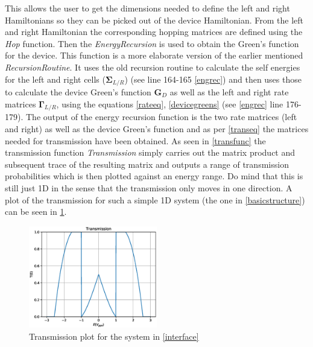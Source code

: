 This allows the user to get the dimensions needed to define the left and right Hamiltonians so they can be picked out of the device Hamiltonian. From the left and right Hamiltonian the corresponding hopping matrices are defined using the \textit{Hop} function. Then the \textit{EnergyRecursion} is used to obtain the Green's function for the device. This function is a more elaborate version of the earlier mentioned \textit{RecursionRoutine}. It uses the old recursion routine to calculate the self energies for the left and right cells (\(\mathbf{\Sigma}_{L/R}\)) (see line 164-165 \cref{engrec}) and then uses those to calculate the device Green's function \(\textbf{G}_D\) as well as the left and right rate matrices \(\mathbf{\Gamma}_{L/R}\), using the equations \cref{rateeq}, \cref{devicegreens} (see \cref{engrec} line 176-179).
\vspace{-1\baselineskip}
\vspace{\baselineskip}The output of the energy recursion function is the two rate matrices (left and right) as well as the device Green's function and as per \cref{transeq} the matrices needed for transmission have been obtained. As seen in \cref{transfunc} the transmission function \textit{Transmission} simply carries out the matrix product and subsequent trace of the resulting matrix and outputs a range of transmission probabilities which is then plotted against an energy range. Do mind that this is still just 1D in the sense that the transmission only moves in one direction. A plot of the transmission for such a simple 1D system (the one in \cref{basicstructure}) can be seen in \cref{alphatrans}.
\vspace{-1\baselineskip}
\vspace{\baselineskip}
\begin{figure}[ht]
    \centering
    \includegraphics[width =0.5\textwidth]{Figures/alphaTE.eps}
    \caption{Transmission plot for the system in \cref{interface}}
    \label{alphatrans}
\end{figure}
